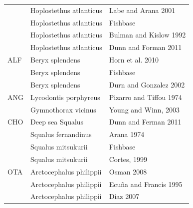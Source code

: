 \documentclass[11pt]{article}
\begin{document}
\begin{center}
\begin{tabular}{lll}
      &  Hoplostethus atlanticus     &  Labe and Arana 2001                                                             \\
      &  Hoplostethus atlanticus     &  Fishbase                                                                        \\
      &  Hoplostethus atlanticus     &  Bulman and Kislow 1992                                                          \\
      &  Hoplostethus atlanticus     &  Dunn and Forman 2011                                                            \\
\hline
 ALF  &  Beryx splendens             &  Horn et al. 2010                                                                \\
      &  Beryx splendens             &  Fishbase                                                                        \\
      &  Beryx splendens             &  Durn and Gonzalez 2002                                                          \\
\hline
 ANG  &  Lycodontis porphyreus       &  Pizarro and Tiffou 1974                                                         \\
      &  Gymnothorax vicinus         &  Young and Winn,  2003                                                           \\
\hline
 CHO  &  Deep sea Squalus            &  Dunn and Ferman 2011                                                            \\
      &  Squalus fernandinus         &  Arana 1974                                                                      \\
      &  Squalus mitsukurii          &  Fishbase                                                                        \\
      &  Squalus mitsukurii          &  Cortes, 1999                                                                    \\
\hline
 OTA  &  Arctocephalus philippii     &  Osman 2008                                                                      \\
      &  Arctocephalus philippii     &  Ecuña and Francis 1995                                                          \\
      &  Arctocephalus philippii     &  Diaz 2007                                                                       \\

\end{tabular}
\end{center}
\end{document}

